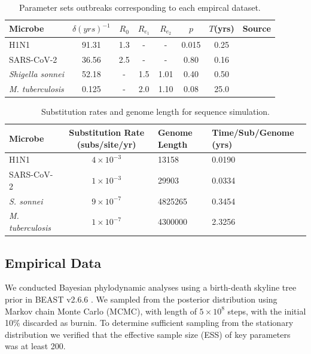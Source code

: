 \documentclass{article}
\begin{document}
\begin{spacing}{1.5}
\begin{table}[ht]
    \centering
    \caption{Parameter sets outbreaks corresponding to each empircal dataset.}
    \begin{tabular}{l|c|c|c|c|c|c|l|}
    \hline
    Microbe                     &   $\delta (yrs)^{-1}$    & $R_0$ &   $R_{e_1}$   &  $R_{e_2}$    &   $p$   &   $T$(yrs)   & Source \\
    \hline
    H1N1                        &   91.31    & 1.3 &   -   &  -    &   0.015   &   0.25 & \citet{hedge_2013_real-time} \\
    SARS-CoV-2                  &   36.56    & 2.5 &   -   &  -   &   0.80   &  0.16 & \citet{lane2021genomics} \\
    \textit{Shigella sonnei}    &   52.18    &  - &   1.5   &  1.01   &   0.40   &   0.50 & \citet{ingle_co-circulation_2019} \\
    \textit{M. tuberculosis}    &   0.125    &  - &   2.0   &  1.10    &   0.08   &   25.0 & \citet{kuhnert_tuberculosis_2018} \\
    \hline
    \end{tabular}
    \label{tab:sim_parms}
\end{table}

\begin{table}[h!]
    \centering
    \caption{Substitution rates and genome length for sequence simulation.}
    \begin{tabular}{l|c|l|l}
    \hline
    Microbe                     &   Substitution Rate (subs/site/yr) & Genome Length & Time/Sub/Genome (yrs)  \\
    \hline
    H1N1                        & $4\times10^{-3}$ & 13158 & 0.0190\\
    SARS-CoV-2                  & $1\times10^{-3}$ & 29903 & 0.0334\\
    \textit{S. sonnei}    & $9\times10^{-7}$ & 4825265  & 0.3454\\
    \textit{M. tuberculosis}    &   $1\times10^{-7}$ & 4300000 & 2.3256\\
    \hline
    \end{tabular}
    \label{tab:seq_parms}
\end{table}

\subsection*{Empirical Data}
We conducted Bayesian phylodynamic analyses using a birth-death skyline tree prior in BEAST v2.6.6 \citep{bouckaert_beast_2019}. We sampled from the posterior distribution using Markov chain Monte Carlo (MCMC), with length of $5\times10^{8}$ steps, with the initial 10\% discarded as burnin. To determine sufficient sampling from the stationary distribution we verified that the effective sample size (ESS) of key parameters was at least 200.


\end{spacing}
\end{document}
